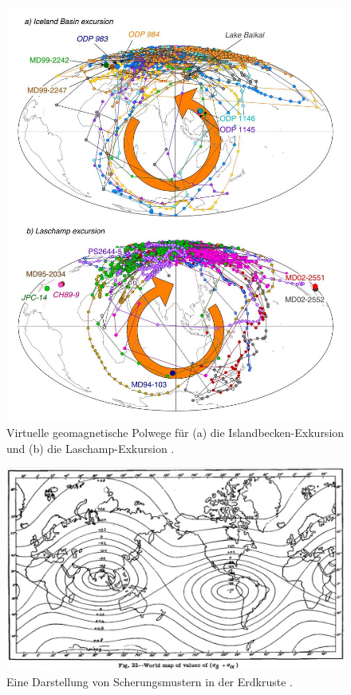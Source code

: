 \documentclass[10pt,twocolumn,letterpaper]{article}
\begin{document}
\begin{figure}[t]
\begin{center}
   \includegraphics[width=0.95\linewidth]{laj.jpg}
\end{center}
   \caption{Virtuelle geomagnetische Polwege für (a) die Islandbecken-Exkursion und (b) die Laschamp-Exkursion \cite{35}.}
\label{fig:7}
\label{fig:onecol}
\end{figure}

\begin{figure}[t]
\begin{center}
   \includegraphics[width=1\linewidth]{meinesz3.jpg}
\end{center}
   \caption{Eine Darstellung von Scherungsmustern in der Erdkruste \cite{36}.}
\label{fig:8}
\label{fig:onecol}
\end{figure}
\end{document}
